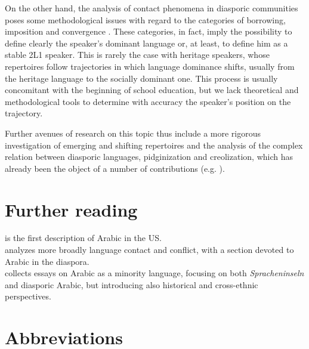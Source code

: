 \documentclass[output=paper]{langsci/langscibook}
\begin{document}
On the other hand, the analysis of contact phenomena in diasporic communities poses some methodological issues with regard to the categories of borrowing, imposition and convergence \citep{VanCoetsem1988,VanCoetsem2000}. These categories, in fact, imply the possibility to define clearly the speaker’s dominant language or, at least, to define him as a stable 2L1 speaker. This is rarely the case with heritage speakers, whose repertoires follow trajectories in which language dominance shifts, usually from the heritage language to the socially dominant one. This process is usually concomitant with the beginning of school education, but we lack theoretical and methodological tools to determine with accuracy the speaker’s position on the trajectory.

Further avenues of research on this topic thus include a more rigorous investigation of emerging and shifting repertoires and the analysis of the complex relation between diasporic languages, pidginization and creolization, which has already been the object of a number of contributions (e.g. \citealt{GonzoSaltarelli1983,Romaine1989}).

\section*{Further reading}

 \citet{Rouchdy_arabic_1992} is the first description of Arabic in the US.\\
 \citet{Rouchdy2002} analyzes more broadly language contact and conflict, with a section devoted to Arabic in the diaspora.\\
 \citet{Owens2000editor} collects essays on Arabic as a minority language, focusing on both \textit{Spracheninseln} and diasporic Arabic, but introducing also historical and cross-ethnic perspectives.\\
 
 \section*{Abbreviations}
\end{document}
